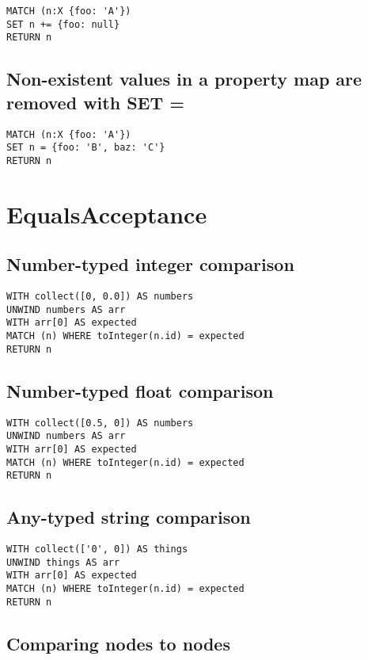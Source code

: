 \begin{lstlisting}
MATCH (n:X {foo: 'A'})
SET n += {foo: null}
RETURN n
\end{lstlisting}

\subsection{Non-existent values in a property map are removed with SET =}

\begin{lstlisting}
MATCH (n:X {foo: 'A'})
SET n = {foo: 'B', baz: 'C'}
RETURN n
\end{lstlisting}
\section{EqualsAcceptance}


\subsection{Number-typed integer comparison}

\begin{lstlisting}
WITH collect([0, 0.0]) AS numbers
UNWIND numbers AS arr
WITH arr[0] AS expected
MATCH (n) WHERE toInteger(n.id) = expected
RETURN n
\end{lstlisting}

\subsection{Number-typed float comparison}

\begin{lstlisting}
WITH collect([0.5, 0]) AS numbers
UNWIND numbers AS arr
WITH arr[0] AS expected
MATCH (n) WHERE toInteger(n.id) = expected
RETURN n
\end{lstlisting}

\subsection{Any-typed string comparison}

\begin{lstlisting}
WITH collect(['0', 0]) AS things
UNWIND things AS arr
WITH arr[0] AS expected
MATCH (n) WHERE toInteger(n.id) = expected
RETURN n
\end{lstlisting}

\subsection{Comparing nodes to nodes}

